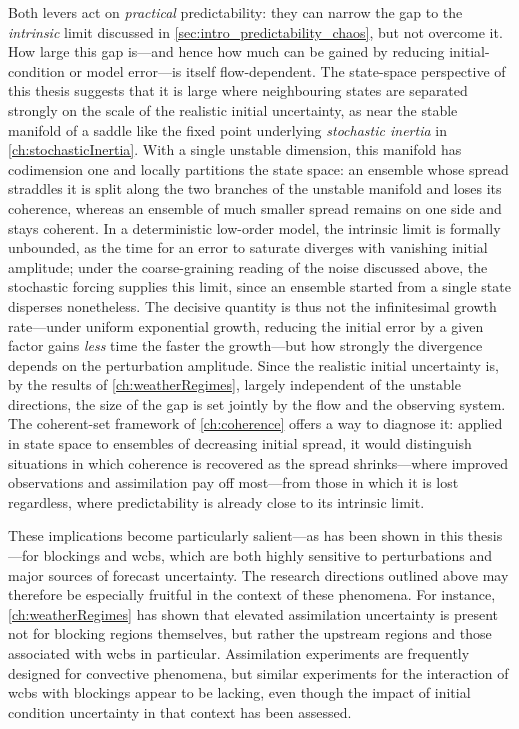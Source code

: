 \medskip

Both levers act on \emph{practical} predictability: they can narrow the gap
to the \emph{intrinsic} limit discussed in
\cref{sec:intro_predictability_chaos}, but not overcome it. How large this gap
is---and hence how much can be gained by reducing initial-condition or model
error---is itself flow-dependent. The state-space perspective of this thesis
suggests that it is large where neighbouring states are separated strongly on
the scale of the realistic initial uncertainty, as near the stable manifold
of a saddle like the fixed point underlying \emph{stochastic inertia} in
\cref{ch:stochasticInertia}. With a single unstable dimension, this manifold
has codimension one and locally partitions the state space: an ensemble whose
spread straddles it is split along the two branches of the unstable manifold
and loses its coherence, whereas an ensemble of much smaller spread remains
on one side and stays coherent. In a deterministic low-order model, the intrinsic limit is formally
unbounded, as the time for an error to saturate diverges with vanishing
initial amplitude; under the coarse-graining reading of the noise discussed
above, the stochastic forcing supplies this limit, since an ensemble started
from a single state disperses nonetheless. The decisive quantity is thus not the
infinitesimal growth rate---under uniform exponential growth, reducing the
initial error by a given factor gains \emph{less} time the faster the
growth---but how strongly the divergence depends on the perturbation
amplitude. Since the realistic initial uncertainty is, by the results of
\cref{ch:weatherRegimes}, largely independent of the unstable directions, the
size of the gap is set jointly by the flow and the observing system. The
coherent-set framework of \cref{ch:coherence} offers a way to diagnose it:
applied in state space to ensembles of decreasing initial spread, it would
distinguish situations in which coherence is recovered as the spread
shrinks---where improved observations and assimilation pay off most---from
those in which it is lost regardless, where predictability is already close
to its intrinsic limit.

These implications become particularly salient---as has been shown in this
thesis---for blockings and \glspl{wcb}, which are both highly sensitive to
perturbations and major sources of forecast uncertainty. The research directions
outlined above may therefore be especially fruitful in the context of these
phenomena. For instance, \cref{ch:weatherRegimes} has shown that elevated
assimilation uncertainty is present not for blocking regions themselves, but
rather the upstream regions and those associated with \glspl{wcb}
in particular. Assimilation experiments are frequently designed for
convective phenomena, but similar experiments for the interaction of
\glspl{wcb} with blockings appear to be
lacking, even though the impact of initial condition uncertainty in that
context has been assessed.

